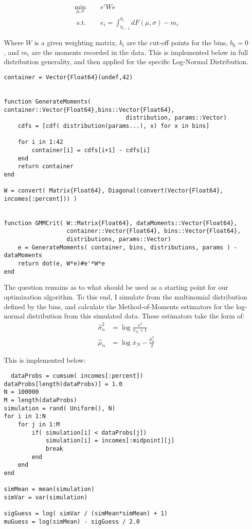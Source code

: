 \documentclass[12pt]{paper}
\newcommand{\mean}[2][N]{ \overline{ #2 }_{#1}}
\newcommand{\est}[2][n]{ \widehat{ #2 }_{#1}}
\begin{document}
\begin{align*}
  \min_{\mu,\sigma} \quad &e' W e\\
  \text{ s.t. } \quad & e_i = \int_{b_{i-1}}^{b_i} dF(\mu,\sigma) - m_i
\end{align*}

Where $W$ is a given weighting matrix, $b_i$ are the cut-off points
for the bins, $b_0 = 0$, and $m_i$ are the moments recorded in the
data. This is implemented below in full distribution generality, and
then applied for the specific Log-Normal Distribution.

\begin{verbatim}
container = Vector{Float64}(undef,42)


function GenerateMoments( container::Vector{Float64},bins::Vector{Float64},
                                   distribution, params::Vector)
    cdfs = [cdf( distribution(params...), x) for x in bins]

    for i in 1:42
        container[i] = cdfs[i+1] - cdfs[i]
    end
    return container
end

W = convert( Matrix{Float64}, Diagonal(convert(Vector{Float64}, incomes[:percent])) )


function GMMCrit( W::Matrix{Float64}, dataMoments::Vector{Float64},
                  container::Vector{Float64}, bins::Vector{Float64},
                  distributions, params::Vector)
    e = GenerateMoments( container, bins, distributions, params ) - dataMoments
    return dot(e, W*e)#e'*W*e
end
\end{verbatim}

The question remains as to what should be used as a starting point for
our optimization algorithm. To this end, I simulate from the
multinomial distribution defined by the bins, and calculate the
Method-of-Moments estimators for the log-normal distribution from this
simulated data. These estimators take the form of:
\begin{align*}
  \est{\sigma}^2 &= \log \frac{s^2}{\mean{x} + 1}\\
  \est{\mu} &= \log \mean{x} - \frac{\est{\sigma}^2}{2}
\end{align*}

This is implemented below:
\begin{verbatim}
  dataProbs = cumsum( incomes[:percent])
dataProbs[length(dataProbs)] = 1.0
N = 100000
M = length(dataProbs)
simulation = rand( Uniform(), N)
for i in 1:N
    for j in 1:M
        if( simulation[i] < dataProbs[j])
            simulation[i] = incomes[:midpoint][j]
            break
        end
    end
end

simMean = mean(simulation)
simVar = var(simulation)

sigGuess = log( simVar / (simMean*simMean) + 1)
muGuess = log(simMean) - sigGuess / 2.0
\end{verbatim}
\end{document}
